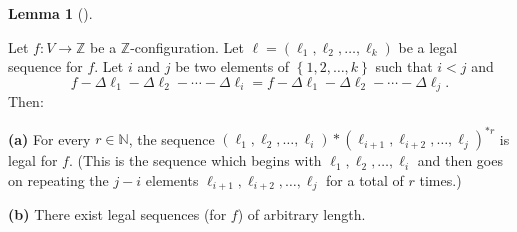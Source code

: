 \documentclass[numbers=enddot,12pt,final,onecolumn,notitlepage]{scrartcl}%
\theoremstyle{definition}
\newtheorem{lem}[theo]{Lemma}
\newenvironment{lemma}[1][]
{\begin{lem}[#1]\begin{leftbar}}
{\end{leftbar}\end{lem}}
\newcommand{\ZZ}{\mathbb{Z}}
\newcommand{\set}[1]{\left\{ #1 \right\}}
\begin{document}
\begin{lemma} \label{lem.chip.leg-repeat}
Let $f : V \to \ZZ$ be a $\ZZ$-configuration.
Let $\ell=\left(  \ell_{1},\ell_{2},\ldots,\ell_{k}\right)  $
be a legal sequence for $f$.
Let $i$ and $j$ be two elements of $\set{1, 2, \ldots, k}$ such that
$i < j$ and
\begin{equation}
f-\Delta\ell_{1}-\Delta\ell_{2}-\cdots-\Delta\ell_{i}=f-\Delta\ell_{1}%
-\Delta\ell_{2}-\cdots-\Delta\ell_{j}.\label{eq.lem.chip.leg-repeat.cond}%
\end{equation}
Then:

\textbf{(a)} For every $r\in\mathbb{N}$, the sequence $\left(  \ell_{1}%
,\ell_{2},\ldots,\ell_{i}\right)  \ast\left(  \ell_{i+1},\ell_{i+2}%
,\ldots,\ell_{j}\right)  ^{\ast r}$ is legal for $f$. (This is the sequence
which begins with $\ell_{1},\ell_{2},\ldots,\ell_{i}$ and then goes on
repeating the $j-i$ elements $\ell_{i+1},\ell_{i+2},\ldots,\ell_{j}$ for a
total of $r$ times.)

\textbf{(b)} There exist legal sequences (for $f$) of arbitrary length.
\end{lemma}
\end{document}
